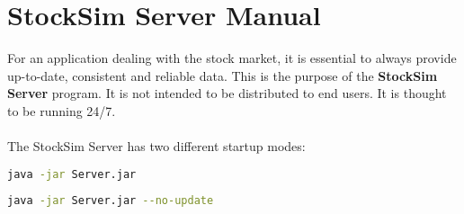 \chapter{StockSim Server Manual}
For an application dealing with the stock market, it is essential to 
always provide up-to-date, consistent and reliable data. This is the purpose of 
the \textbf{StockSim Server} program. It is not intended to be distributed to 
end users. It is thought to be running 24/7.\\
\\
The StockSim Server has two different startup modes:
\begin{lstlisting}[language=bash]
java -jar Server.jar
\end{lstlisting}

\begin{lstlisting}[language=bash]
java -jar Server.jar --no-update
\end{lstlisting}

